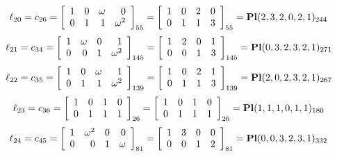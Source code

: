 $$
\ell_{20} = c_{26} = 
\left[
\begin{array}{*{4}{r}}
1 & 0 & \omega  & 0\\
0 & 1 & 1 & \omega^{2}\\
\end{array}
\right]
_{55}
=
\left[
\begin{array}{*{4}c}
1  & 0  & 2  & 0\\
0  & 1  & 1  & 3\\
\end{array}
\right]_{55}
={\rm\bf Pl}(2,3,2,0,2,1 )_{244}$$
$$
\ell_{21} = c_{34} = 
\left[
\begin{array}{*{4}{r}}
1 & \omega  & 0 & 1\\
0 & 0 & 1 & \omega^{2}\\
\end{array}
\right]
_{145}
=
\left[
\begin{array}{*{4}c}
1  & 2  & 0  & 1\\
0  & 0  & 1  & 3\\
\end{array}
\right]_{145}
={\rm\bf Pl}(0,3,2,3,2,1 )_{271}$$
$$
\ell_{22} = c_{35} = 
\left[
\begin{array}{*{4}{r}}
1 & 0 & \omega  & 1\\
0 & 1 & 1 & \omega^{2}\\
\end{array}
\right]
_{139}
=
\left[
\begin{array}{*{4}c}
1  & 0  & 2  & 1\\
0  & 1  & 1  & 3\\
\end{array}
\right]_{139}
={\rm\bf Pl}(2,0,2,3,2,1 )_{267}$$
$$
\ell_{23} = c_{36} = 
\left[
\begin{array}{*{4}{r}}
1 & 0 & 1 & 0\\
0 & 1 & 1 & 1\\
\end{array}
\right]
_{26}
=
\left[
\begin{array}{*{4}c}
1  & 0  & 1  & 0\\
0  & 1  & 1  & 1\\
\end{array}
\right]_{26}
={\rm\bf Pl}(1,1,1,0,1,1 )_{180}$$
$$
\ell_{24} = c_{45} = 
\left[
\begin{array}{*{4}{r}}
1 & \omega^{2} & 0 & 0\\
0 & 0 & 1 & \omega \\
\end{array}
\right]
_{81}
=
\left[
\begin{array}{*{4}c}
1  & 3  & 0  & 0\\
0  & 0  & 1  & 2\\
\end{array}
\right]_{81}
={\rm\bf Pl}(0,0,3,2,3,1 )_{332}$$
